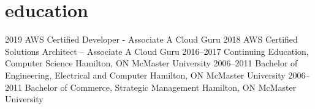 \documentclass[]{cv}
\begin{document}
\section{education}

\begin{entrylist}
    \entry
        {2019}
        {AWS Certified Developer - Associate}
        {}
        {A Cloud Guru}
    \entry
        {2018}
        {AWS Certified Solutions Architect – Associate}
        {}
        {A Cloud Guru}
    \entry
        {2016–2017}
        {Continuing Education, Computer Science}
        {Hamilton, ON}
        {McMaster University}
    \entry
        {2006–2011}
        {Bachelor of Engineering, Electrical and Computer}
        {Hamilton, ON}
        {McMaster University}
    \entry
        {2006–2011}
        {Bachelor of Commerce, Strategic Management}
        {Hamilton, ON}
        {McMaster University}
\end{entrylist}
\end{document}
